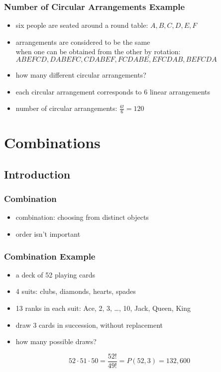 \documentclass[dvipsnames]{beamer}
\begin{document}

\begin{frame}
  \frametitle{Number of Circular Arrangements Example}

  \begin{itemize}
    \item six people are seated around a round table: $A,B,C,D,E,F$
    \item arrangements are considered to be the same\\
      when one can be obtained from the other by rotation:\\
      \smallskip
      $ABEFCD, DABEFC, CDABEF, FCDABE, EFCDAB, BEFCDA$
    \item how many different circular arrangements?

    \pause
    \medskip
    \item each circular arrangement corresponds to 6 linear arrangements
    \item number of circular arrangements: $\frac{6!}{6} = 120$
  \end{itemize}
\end{frame}

\section{Combinations}

\subsection{Introduction}

\begin{frame}
  \frametitle{Combination}

  \begin{itemize}
    \item \alert{combination}: choosing from distinct objects
    \item order isn't important
  \end{itemize}
\end{frame}

\begin{frame}
  \frametitle{Combination Example}

  \begin{itemize}
    \item a deck of 52 playing cards
    \item 4 suits: clubs, diamonds, hearts, spades
    \item 13 ranks in each suit: Ace, 2, 3, \ldots, 10, Jack, Queen, King
    \item draw 3 cards in succession, without replacement
    \item how many possible draws?
  \end{itemize}

  \pause
  \begin{equation*}
    52 \cdot 51 \cdot 50 = \frac{52!}{49!} = P(52,3) = 132,600
  \end{equation*}
\end{frame}
\end{document}
